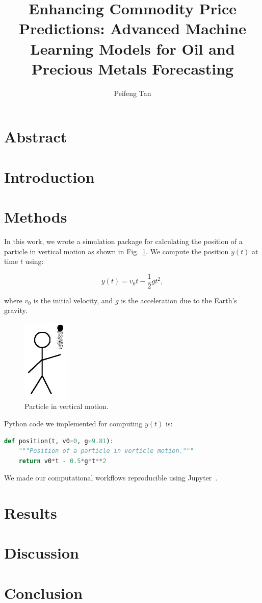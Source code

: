 \documentclass[project-plan]{report-template}
\title{Enhancing Commodity Price Predictions: Advanced Machine Learning Models for Oil and Precious Metals Forecasting}
\author{Peifeng Tan}
\begin{document}
\maketitlepage  %

\section*{Abstract}
\blindtext  %

\section{Introduction}
\blindtext[3]

\section{Methods}
In this work, we wrote a simulation package for calculating the position of a particle in vertical motion as shown in Fig.~\ref{fig:experiment}. We compute the position $y(t)$ at time $t$ using:

\begin{equation}
    \label{eq:vertical-position}
    y(t) = v_{0}t - \frac{1}{2}gt^{2},
\end{equation}

where $v_{0}$ is the initial velocity, and $g$ is the acceleration due to the Earth's gravity.

\begin{figure}
    \begin{center}
        \includegraphics[width=0.2\textwidth]{experiment.jpg}
    \end{center}
    \caption{\label{fig:experiment} Particle in vertical motion.}
\end{figure}

Python code we implemented for computing $y(t)$ is:

\begin{lstlisting}[language=Python]
def position(t, v0=0, g=9.81):
    """Position of a particle in verticle motion."""
    return v0*t - 0.5*g*t**2
\end{lstlisting}

We made our computational workflows reproducible using Jupyter~\cite{Beg2021}.

\section{Results}
\blindtext[3]

\section{Discussion}
\blindtext[2]

\section{Conclusion}
\blindtext[2]


\end{document}
